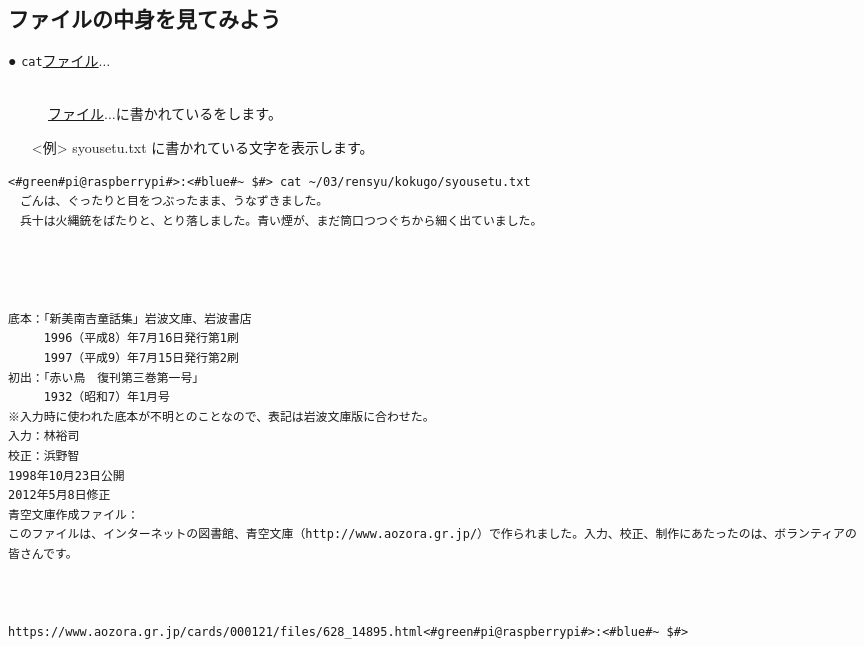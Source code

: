 \subsection{ファイルの中身を見てみよう}
\begin{description}
\item[● \texttt{cat}\textvisiblespace \underline{ファイル}$\ldots$ ]\mbox{}\\
\underline{ファイル}$\ldots$に書かれているをします。
\end{description}
\begin{itemize}
\item[<例>]syousetu.txt に書かれている文字を表示します。
\end{itemize}
\begin{lstlisting}[caption=catの例, label=cat]
<#green#pi@raspberrypi#>:<#blue#~ $#> cat ~/03/rensyu/kokugo/syousetu.txt
　ごんは、ぐったりと目をつぶったまま、うなずきました。
　兵十は火縄銃をばたりと、とり落しました。青い煙が、まだ筒口つつぐちから細く出ていました。




底本：「新美南吉童話集」岩波文庫、岩波書店
　　　1996（平成8）年7月16日発行第1刷
　　　1997（平成9）年7月15日発行第2刷
初出：「赤い鳥　復刊第三巻第一号」
　　　1932（昭和7）年1月号
※入力時に使われた底本が不明とのことなので、表記は岩波文庫版に合わせた。
入力：林裕司
校正：浜野智
1998年10月23日公開
2012年5月8日修正
青空文庫作成ファイル：
このファイルは、インターネットの図書館、青空文庫（http://www.aozora.gr.jp/）で作られました。入力、校正、制作にあたったのは、ボランティアの皆さんです。



https://www.aozora.gr.jp/cards/000121/files/628_14895.html<#green#pi@raspberrypi#>:<#blue#~ $#>
\end{lstlisting}



